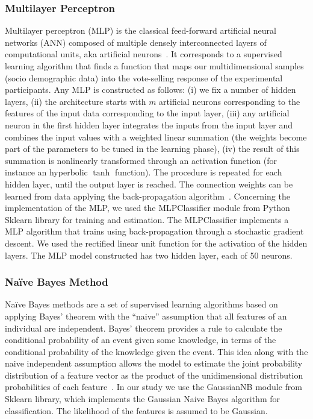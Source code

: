 \documentclass[10pt,leqno]{amsart}
\begin{document}
\subsubsection{Multilayer Perceptron} Multilayer perceptron (MLP) is the classical feed-forward artificial neural networks (ANN) composed of multiple densely interconnected layers of computational units, aka artificial neurons~\cite{wolff2019machine}. It corresponds to a supervised learning algorithm that finds a function that maps our multidimensional samples (socio demographic data) into the vote-selling response of the experimental participants. Any MLP is constructed as follows: (i) we fix a number of hidden layers, (ii) the architecture starts with $m$ artificial neurons corresponding to the features of the input data corresponding to the input layer, (iii) any artificial neuron in the first hidden layer integrates the inputs from the input layer and combines the input values with a weighted linear summation (the weights become part of the parameters to be tuned in the learning phase), (iv) the result of this summation is nonlinearly transformed through an activation function (for instance an hyperbolic $\tanh$ function). The procedure is repeated for each hidden layer, until the output layer is reached. The connection weights can be learned from data applying the back-propagation algorithm~\cite{haykin2004comprehensive}. Concerning the implementation of the MLP, we used the MLPClassifier module from Python Sklearn library for training and estimation. The MLPClassifier implements a MLP algorithm that trains using back-propagation through a stochastic gradient descent. We used the rectified linear unit function for the activation of the hidden layers. The MLP model constructed has two hidden layer, each of 50 neurons.

\subsubsection{Na\"ive Bayes Method} Na\"ive Bayes methods are a set of supervised learning algorithms based on applying Bayes’ theorem with the ``naive'' assumption that all features of an individual are independent. Bayes’ theorem provides a rule to calculate the conditional probability of an event given some knowledge, in terms of the conditional probability of the knowledge given the event. This idea along with the naive independent assumption allows the model to estimate the joint probability distribution of a  feature vector as the product of the unidimensional distribution probabilities of each feature~\cite{wolff2019machine}. In our study we use the GaussianNB module from Sklearn library, which implements the Gaussian Naive Bayes algorithm for classification. The likelihood of the features is assumed to be Gaussian.
\end{document}
